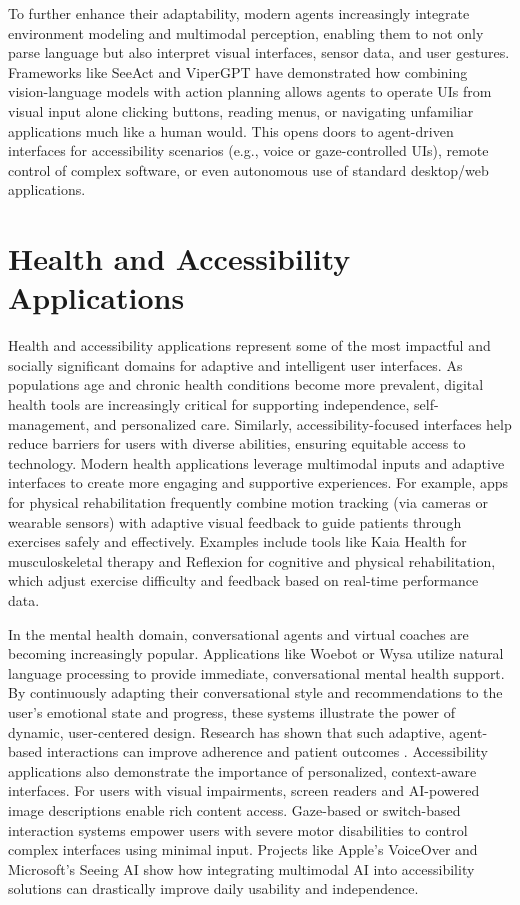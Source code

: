 \documentclass[openany]{book}
\begin{document}
To further enhance their adaptability, modern agents increasingly integrate environment modeling and multimodal perception, enabling them to not only parse language but also interpret visual interfaces, sensor data, and user gestures. Frameworks like SeeAct \cite{zheng2024gpt4visiongeneralistwebagent} and ViperGPT \cite{surís2023vipergptvisualinferencepython} have demonstrated how combining vision-language models with action planning allows agents to operate UIs from visual input alone clicking buttons, reading menus, or navigating unfamiliar applications much like a human would. This opens doors to agent-driven interfaces for accessibility scenarios (e.g., voice or gaze-controlled UIs), remote control of complex software, or even autonomous use of standard desktop/web applications. 

\section{Health and Accessibility Applications}
Health and accessibility applications represent some of the most impactful and socially significant domains for adaptive and intelligent user interfaces. As populations age and chronic health conditions become more prevalent, digital health tools are increasingly critical for supporting independence, self-management, and personalized care. Similarly, accessibility-focused interfaces help reduce barriers for users with diverse abilities, ensuring equitable access to technology.
Modern health applications leverage multimodal inputs and adaptive interfaces to create more engaging and supportive experiences. For example, apps for physical rehabilitation frequently combine motion tracking (via cameras or wearable sensors) with adaptive visual feedback to guide patients through exercises safely and effectively. Examples include tools like Kaia Health \cite{Toelle2019} for musculoskeletal therapy and Reflexion for cognitive and physical rehabilitation, which adjust exercise difficulty and feedback based on real-time performance data.

In the mental health domain, conversational agents and virtual coaches are becoming increasingly popular. Applications like Woebot or Wysa utilize natural language processing to provide immediate, conversational mental health support. By continuously adapting their conversational style and recommendations to the user's emotional state and progress, these systems illustrate the power of dynamic, user-centered design. Research has shown that such adaptive, agent-based interactions can improve adherence and patient outcomes \cite{fitzpatrick2017delivering}.
Accessibility applications also demonstrate the importance of personalized, context-aware interfaces. For users with visual impairments, screen readers and AI-powered image descriptions enable rich content access. Gaze-based or switch-based interaction systems empower users with severe motor disabilities to control complex interfaces using minimal input. Projects like Apple's VoiceOver and Microsoft's Seeing AI show how integrating multimodal AI into accessibility solutions can drastically improve daily usability and independence.
\end{document}
